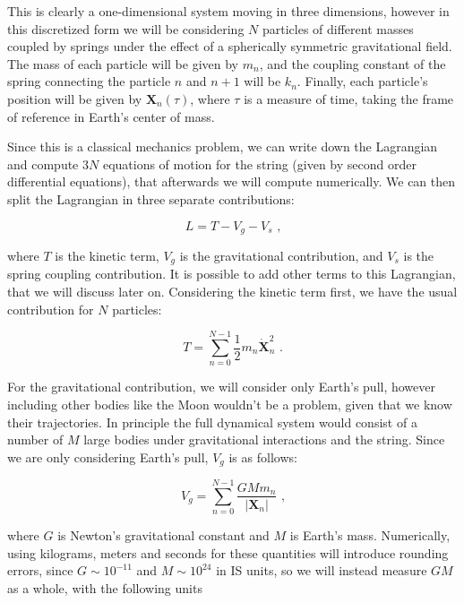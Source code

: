 \documentclass[8 pt, twocolumn]{article}
\renewcommand{\vec}[1]{\pmb{#1}}
\begin{document}
This is clearly a one-dimensional system moving in three dimensions, however in this discretized form we will be considering $N$ particles of different masses coupled by springs under the effect of a spherically symmetric gravitational field. The mass of each particle will be given by $m_n$, and the coupling constant of the spring connecting the particle $n$ and $n+1$ will be $k_n$. Finally, each particle's position will be given by $\vec{X}_n(\tau)$, where $\tau$ is a measure of time, taking the frame of reference in Earth's center of mass.

Since this is a classical mechanics problem, we can write down the Lagrangian and compute $3N$ equations of motion for the string (given by second order differential equations), that afterwards we will compute numerically. We can then split the Lagrangian in three separate contributions:

\begin{equation}
  L = T - V_g - V_s \text{ ,}
\end{equation}

where $T$ is the kinetic term, $V_g$ is the gravitational contribution, and $V_s$ is the spring coupling contribution. It is possible to add other terms to this Lagrangian, that we will discuss later on. Considering the kinetic term first, we have the usual contribution for $N$ particles:

\begin{equation}
  T = \sum_{n=0}^{N-1} \frac{1}{2} m_n \vec{\dot X}^2_n \text{ .}
\end{equation}

For the gravitational contribution, we will consider only Earth's pull, however including other bodies like the Moon wouldn't be a problem, given that we know their trajectories. In principle the full dynamical system would consist of a number of $M$ large bodies under gravitational interactions and the string. Since we are only considering Earth's pull, $V_g$ is as follows:

\begin{equation}
  V_g = \sum_{n=0}^{N-1} \frac{G M m_n}{|\vec{X}_n|} \text{ ,}
\end{equation}

where $G$ is Newton's gravitational constant and $M$ is Earth's mass. Numerically, using kilograms, meters and seconds for these quantities will introduce rounding errors, since $G\sim 10^{-11}$ and $M\sim10^{24}$ in IS units, so we will instead measure $GM$ as a whole, with the following units
\end{document}
